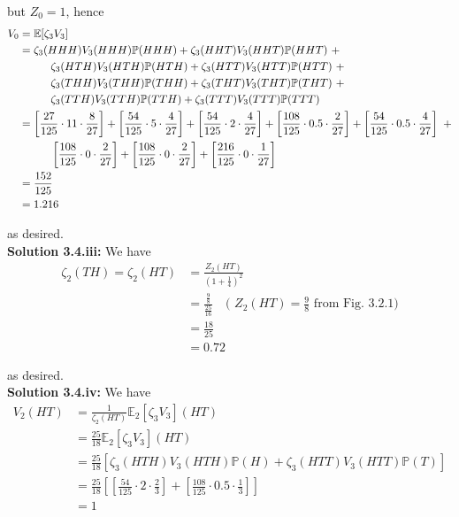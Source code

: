 \documentclass[12pt]{article}
\renewcommand{\P}{\mathbb P}
\newcommand{\E}{\mathbb E}
\begin{document}
but $Z_0 = 1$, hence
\begin{align*}
	V_0 &= \E[\zeta_3 V_3] \\
	&= \zeta_3(HHH)V_3(HHH) \P(HHH) + \zeta_3(HHT)V_3(HHT) \P(HHT)~+ \\ 
	&\hphantom{{}={--}} \zeta_3(HTH)V_3(HTH) \P(HTH) + \zeta_3(HTT)V_3(HTT) \P(HTT)~+ \\
	&\hphantom{{}={--}} \zeta_3(THH)V_3(THH) \P(THH) + \zeta_3(THT)V_3(THT) \P(THT)~+ \\
	&\hphantom{{}={--}} \zeta_3(TTH)V_3(TTH)\P(TTH) + \zeta_3(TTT)V_3(TTT)\P(TTT) \\
	&= \left[ \frac{27}{125} \cdot 11 \cdot \frac{8}{27} \right] + \left[ \frac{54}{125} \cdot 5 \cdot \frac{4}{27} \right] + \left[ \frac{54}{125} \cdot 2 \cdot \frac{4}{27} \right] + \left[ \frac{108}{125} \cdot 0.5 \cdot \frac{2}{27} \right] + \left[ \frac{54}{125} \cdot 0.5 \cdot \frac{4}{27} \right]~+ \\
	&\hphantom{{}={--}} \left[ \frac{108}{125} \cdot 0 \cdot \frac{2}{27} \right] + \left[ \frac{108}{125} \cdot 0 \cdot \frac{2}{27} \right] + \left[ \frac{216}{125} \cdot 0 \cdot \frac{1}{27} \right]\\
	&= \frac{152}{125} \\
	&= 1.216
\end{align*}

as desired. \\

{\bf Solution 3.4.iii:} We have
\begin{align*}
	\zeta_2(TH) = \zeta_2(HT) &= \frac{Z_2(HT)}{\left(1 + \frac{1}{4} \right)^2} \\
	&= \frac{ \frac{9}{8} }{ \frac{25}{16} } \quad \text{( $Z_2(HT) = \frac{9}{8}$ from Fig. 3.2.1)} \\
	&= \frac{18}{25} \\
	&= 0.72
\end{align*}

as desired. \\

{\bf Solution 3.4.iv:} We have
\begin{align*}
	V_2(HT) &= \frac{1}{\zeta_2(HT)} \E_2[\zeta_3V_3](HT) \\
	&= \frac{25}{18} \E_2[\zeta_3V_3](HT) \\
	&= \frac{25}{18} \left[ \zeta_3(HTH)V_3(HTH) \P(H) + \zeta_3(HTT)V_3(HTT) \P(T) \right] \\
	&= \frac{25}{18} \left[ \left[ \frac{54}{125} \cdot 2 \cdot \frac{2}{3} \right] + \left[ \frac{108}{125} \cdot 0.5 \cdot \frac{1}{3} \right] \right] \\
	&= 1
\end{align*}
\end{document}
